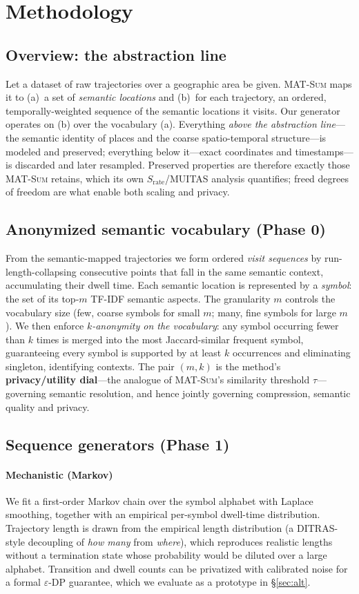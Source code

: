\documentclass[sigconf,nonacm]{acmart}
\begin{document}
\section{Methodology}

\subsection{Overview: the abstraction line}
Let a dataset of raw trajectories over a geographic area be given. \textsc{MAT-Sum} maps it to (a)~a
set of \emph{semantic locations} and (b)~for each trajectory, an ordered, temporally-weighted sequence
of the semantic locations it visits. Our generator operates on (b) over the vocabulary (a). Everything
\emph{above the abstraction line}---the semantic identity of places and the coarse spatio-temporal
structure---is modeled and preserved; everything below it---exact coordinates and timestamps---is
discarded and later resampled. Preserved properties are therefore exactly those \textsc{MAT-Sum}
retains, which its own $S_{\text{rate}}$/MUITAS analysis quantifies; freed degrees of freedom are what
enable both scaling and privacy.

\subsection{Anonymized semantic vocabulary (Phase 0)}
From the semantic-mapped trajectories we form ordered \emph{visit sequences} by run-length-collapsing
consecutive points that fall in the same semantic context, accumulating their dwell time. Each
semantic location is represented by a \emph{symbol}: the set of its top-$m$ TF-IDF semantic aspects.
The granularity $m$ controls the vocabulary size (few, coarse symbols for small $m$; many, fine
symbols for large $m$). We then enforce \emph{$k$-anonymity on the vocabulary}: any symbol occurring
fewer than $k$ times is merged into the most Jaccard-similar frequent symbol, guaranteeing every
symbol is supported by at least $k$ occurrences and eliminating singleton, identifying contexts. The
pair $(m,k)$ is the method's \textbf{privacy/utility dial}---the analogue of \textsc{MAT-Sum}'s
similarity threshold $\tau$---governing semantic resolution, and hence jointly governing compression,
semantic quality and privacy.

\subsection{Sequence generators (Phase 1)}
\paragraph{Mechanistic (Markov)}
We fit a first-order Markov chain over the symbol alphabet with Laplace smoothing, together with an
empirical per-symbol dwell-time distribution. Trajectory length is drawn from the empirical length
distribution (a DITRAS-style decoupling of \emph{how many} from \emph{where}), which reproduces
realistic lengths without a termination state whose probability would be diluted over a large
alphabet. Transition and dwell counts can be privatized with calibrated noise for a formal
$\varepsilon$-DP guarantee, which we evaluate as a prototype in \S\ref{sec:alt}.
\end{document}
